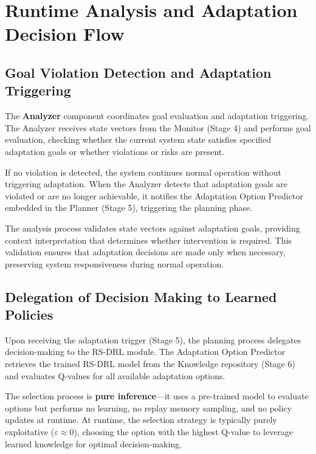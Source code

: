 \documentclass[11pt,a4paper]{article}
\begin{document}
\section{Runtime Analysis and Adaptation Decision Flow}
\label{sec:decision-flow}

\subsection{Goal Violation Detection and Adaptation Triggering}
\label{subsec:goal-violation}

The \textbf{Analyzer} component coordinates goal evaluation and adaptation triggering. The Analyzer receives state vectors from the Monitor (Stage 4) and performs goal evaluation, checking whether the current system state satisfies specified adaptation goals or whether violations or risks are present.

If no violation is detected, the system continues normal operation without triggering adaptation. When the Analyzer detects that adaptation goals are violated or are no longer achievable, it notifies the Adaptation Option Predictor embedded in the Planner (Stage 5), triggering the planning phase.

The analysis process validates state vectors against adaptation goals, providing context interpretation that determines whether intervention is required. This validation ensures that adaptation decisions are made only when necessary, preserving system responsiveness during normal operation.

\subsection{Delegation of Decision Making to Learned Policies}
\label{subsec:delegation}

Upon receiving the adaptation trigger (Stage 5), the planning process delegates decision-making to the RS-DRL module. The Adaptation Option Predictor retrieves the trained RS-DRL model from the Knowledge repository (Stage 6) and evaluates Q-values for all available adaptation options.

The selection process is \textbf{pure inference}---it uses a pre-trained model to evaluate options but performs no learning, no replay memory sampling, and no policy updates at runtime. At runtime, the selection strategy is typically purely exploitative ($\varepsilon \approx 0$), choosing the option with the highest Q-value to leverage learned knowledge for optimal decision-making.
\end{document}
